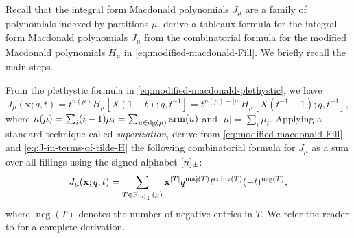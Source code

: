 
Recall that the integral form Macdonald polynomials \(J_\mu\) are a family of polynomials indexed by partitions \(\mu\).
\citeauthor{HHL05} \cite[Section~7]{HHL05} derive a tableaux formula for the integral form Macdonald polynomials \(J_\mu\) from the combinatorial formula for the modified Macdonald polynomials \(\tilde{H}_\mu\) in \eqref{eq:modified-macdonald-Fill}.
We briefly recall the main steps.  

From the plethystic formula in \eqref{eq:modified-macdonald-plethystic}, we have
\begin{equation} \label{eq:J-in-terms-of-tilde-H}
	J_\mu(\mathbf{x}; q, t)
	= t^{n(\mu)} \tilde{H}_\mu\left[ X (1 - t); q, t^{-1} \right]
	= t^{n(\mu)+|\mu|} \tilde{H}_{\mu}\left[ X (t^{-1} - 1); q, t^{-1} \right],
\end{equation}
where \(n(\mu) = \sum_{i} (i-1) \mu_i = \sum_{u \in \dg(\mu)} \arm(u)\) and \(|\mu| = \sum_i \mu_i\).
Applying a standard technique called \emph{superization},
\cite{HHL05} derive from \eqref{eq:modified-macdonald-Fill} and \eqref{eq:J-in-terms-of-tilde-H} the following combinatorial formula for \(J_\mu\) as a sum over all fillings using the signed alphabet \([n]_\pm\):
\begin{equation} \label{eq:J-Fill-signed}
	J_\mu(\mathbf{x}; q, t)
	= \sum_{T \in \Fill[\interval{n}_\pm](\mu)}
	\mathbf{x}^{|T|}
	q^{\maj(T)}
	t^{\coinv(T)}
	(-t)^{\operatorname{neg}(T)},
\end{equation}
where \(\operatorname{neg}(T)\) denotes the number of negative entries in \(T\).  
We refer the reader to \cite[Section~7]{HHL05} for a complete derivation.

